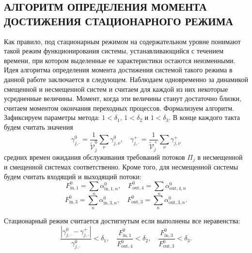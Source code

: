 \documentclass[11pt]{ubs}
\begin{document}
\subsection{АЛГОРИТМ ОПРЕДЕЛЕНИЯ МОМЕНТА ДОСТИЖЕНИЯ СТАЦИОНАРНОГО РЕЖИМА}
Как правило, под стационарным режимом на содержательном уровне понимают такой режим функционирования системы, устанавливающийся с течением времени, при котором выделенные ее характеристики остаются неизменными. Идея алгоритма определения момента достижения системой такого режима в данной работе заключается в следующем. Наблюдаем одновременно за динамикой смещенной и несмещенной систем и считаем для каждой из них некоторые усредненные величины. Момент, когда эти величины станут достаточно близки, считаем моментом окончания переходных процессов. Формализуем алгоритм. Зафиксируем параметры метода:  $1 < \delta_1$, $1 < \delta_2$ и $1 < \delta_3$. В конце каждого такта будем считать значения 
\begin{equation}
   \gamma_{j,\cdot}^0 = \frac{1}{\tilde{\mathcal{V}}_j^0}\sum_{\nu} \gamma_{j,\nu}^0, \quad \gamma_{j,\cdot}^+ = \frac{1}{\tilde{\mathcal{V}}_j^+}\sum_{\nu} \gamma_{j,\nu}^+ 
\end{equation}
средних времен ожидания обслуживания требований потоков $\Pi_j$ в несмещенной и смещенной системах соответственно. Кроме того, для несмещенной системы будем считать входящий и выходящий потоки:
\begin{equation}
    F^{0}_{\text{in},1} = \sum_n \alpha^{0}_{\text{in},1,n}, \quad 
    F^{0}_{\text{out},4} = \sum_n \alpha^{0}_{\text{out},4,n}
\end{equation}
\begin{equation}
    F^{0}_{\text{in},3} = \sum_n \alpha^{0}_{\text{in},3,n}, \quad 
    F^{0}_{\text{out},3} = \sum_n \alpha^{0}_{\text{out},3,n}.
\end{equation}


Стационарный режим считается достигнутым если выполнены все неравенства:
\begin{equation}
    \frac{|\gamma_{j,\cdot}^0 - \gamma_{j,\cdot}^+|}{\gamma_{j,\cdot}^0} < \delta_1, \quad
    \frac{F^{0}_{\text{in},1}}{F^{0}_{\text{out},4}} < \delta_2, \quad 
    \frac{F^{0}_{\text{in},3}}{F^{0}_{\text{out},3}} < \delta_3.
\end{equation}
\end{document}
